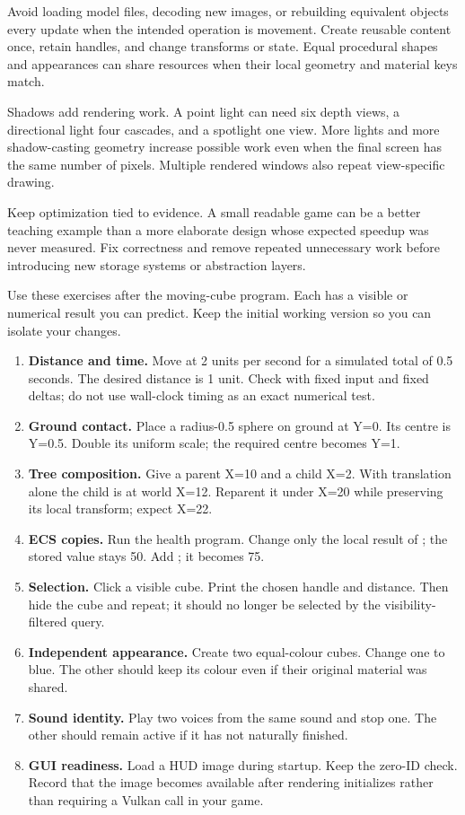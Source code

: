 \documentclass[11pt,a4paper]{article}
\begin{document}
Avoid loading model files, decoding new images, or rebuilding equivalent objects every update when the intended operation is movement. Create reusable content once, retain handles, and change transforms or state. Equal procedural shapes and appearances can share resources when their local geometry and material keys match.

Shadows add rendering work. A point light can need six depth views, a directional light four cascades, and a spotlight one view. More lights and more shadow-casting geometry increase possible work even when the final screen has the same number of pixels. Multiple rendered windows also repeat view-specific drawing.

Keep optimization tied to evidence. A small readable game can be a better teaching example than a more elaborate design whose expected speedup was never measured. Fix correctness and remove repeated unnecessary work before introducing new storage systems or abstraction layers.

Use these exercises after the moving-cube program. Each has a visible or numerical result you can predict. Keep the initial working version so you can isolate your changes.

\begin{enumerate}
\item \textbf{Distance and time.} Move at 2 units per second for a simulated total of 0.5 seconds. The desired distance is 1 unit. Check with fixed input and fixed deltas; do not use wall-clock timing as an exact numerical test.
\item \textbf{Ground contact.} Place a radius-0.5 sphere on ground at Y=0. Its centre is Y=0.5. Double its uniform scale; the required centre becomes Y=1.
\item \textbf{Tree composition.} Give a parent X=10 and a child X=2. With translation alone the child is at world X=12. Reparent it under X=20 while preserving its local transform; expect X=22.
\item \textbf{ECS copies.} Run the health program. Change only the local result of ; the stored value stays 50. Add ; it becomes 75.
\item \textbf{Selection.} Click a visible cube. Print the chosen handle and distance. Then hide the cube and repeat; it should no longer be selected by the visibility-filtered query.
\item \textbf{Independent appearance.} Create two equal-colour cubes. Change one to blue. The other should keep its colour even if their original material was shared.
\item \textbf{Sound identity.} Play two voices from the same sound and stop one. The other should remain active if it has not naturally finished.
\item \textbf{GUI readiness.} Load a HUD image during startup. Keep the zero-ID check. Record that the image becomes available after rendering initializes rather than requiring a Vulkan call in your game.
\end{enumerate}
\end{document}

